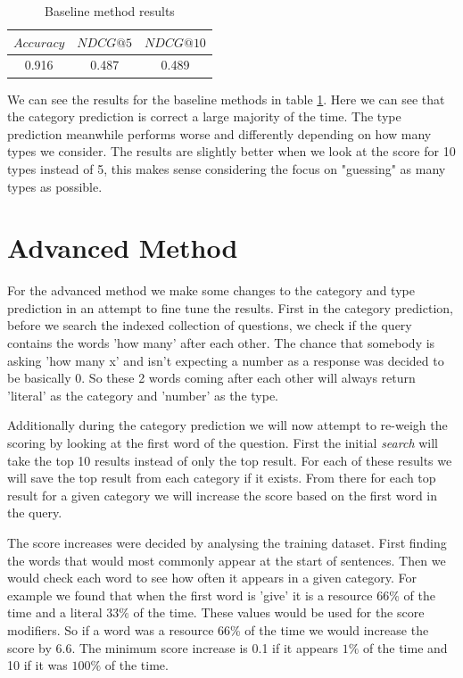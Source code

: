 \documentclass[sigconf]{acmart}
\begin{document}
\begin{table}[h]
    \centering
    \caption{Baseline method results}
    \begin{tabular}{c|c|c}
    $Accuracy$ & $NDCG@5$ & $NDCG@10$ \\
    \hline
    0.916 & 0.487 & 0.489
    \end{tabular}
    \label{tab:baseline_res}
\end{table}

We can see the results for the baseline methods in table \ref{tab:baseline_res}. Here we can see that the category prediction is correct a large majority of the time. The type prediction meanwhile performs worse and differently depending on how many types we consider. The results are slightly better when we look at the score for 10 types instead of 5, this makes sense considering the focus on "guessing" as many types as possible.

\section{Advanced Method}
For the advanced method we make some changes to the category and type prediction in an attempt to fine tune the results. First in the category prediction, before we search the indexed collection of questions, we check if the query contains the words 'how many' after each other. The chance that somebody is asking 'how many x' and isn't expecting a number as a response was decided to be basically 0. So these 2 words coming after each other will always return 'literal' as the category and 'number' as the type. 

Additionally during the category prediction we will now attempt to re-weigh the scoring by looking at the first word of the question. First the initial \emph{search} will take the top 10 results instead of only the top result. For each of these results we will save the top result from each category if it exists. From there for each top result for a given category we will increase the score based on the first word in the query.

The score increases were decided by analysing the training dataset. First finding the words that would most commonly appear at the start of sentences. Then we would check each word to see how often it appears in a given category. For example we found that when the first word is 'give' it is a resource $66\%$ of the time and a literal $33\%$ of the time. These values would be used for the score modifiers. So if a word was a resource 66\% of the time we would increase the score by $6.6$. The minimum score increase is 0.1 if it appears $1\%$ of the time and 10 if it was $100\%$ of the time.
\end{document}
